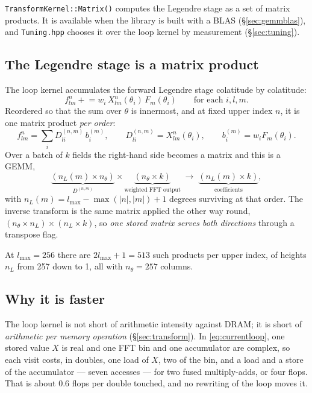 \documentclass[11pt,a4paper]{article}
\newcommand{\code}[1]{\texttt{#1}}
\begin{document}
\code{TransformKernel::Matrix()} computes the Legendre stage as a set of
matrix products.  It is available when the library is built with a BLAS
(\S\ref{sec:gemmblas}), and \code{Tuning.hpp} chooses it over the loop
kernel by measurement (\S\ref{sec:tuning}).

\subsection{The Legendre stage is a matrix product}

The loop kernel accumulates the forward Legendre stage colatitude by
colatitude:
\begin{equation}
  f^{n}_{lm} \mathrel{+}= w_i\, X^{n}_{lm}(\theta_i)\, F_m(\theta_i)
  \qquad\text{for each } i, l, m .
  \label{eq:currentloop}
\end{equation}
Reordered so that the sum over $\theta$ is innermost, and at fixed upper
index $n$, it is one matrix product \emph{per order}:
\begin{equation}
  f^{n}_{lm} = \sum_{i} D^{(n,m)}_{l i}\, b^{(m)}_{i},
  \qquad
  D^{(n,m)}_{l i} = X^{n}_{lm}(\theta_i),
  \qquad
  b^{(m)}_{i} = w_i F_m(\theta_i).
  \label{eq:gemv}
\end{equation}
Over a batch of $k$ fields the right-hand side becomes a matrix and this is
a GEMM,
\begin{equation}
  \underbrace{(n_L(m) \times n_\theta)}_{D^{(n,m)}}
  \times
  \underbrace{(n_\theta \times k)}_{\text{weighted FFT output}}
  \;\longrightarrow\;
  \underbrace{(n_L(m) \times k)}_{\text{coefficients}},
  \label{eq:gemmshape}
\end{equation}
with $n_L(m) = l_{\max} - \max(|n|,|m|) + 1$ degrees surviving at that
order.  The inverse transform is the same matrix applied the other way
round, $(n_\theta \times n_L) \times (n_L \times k)$, so \emph{one stored
matrix serves both directions} through a transpose flag.

At $l_{\max}=256$ there are $2l_{\max}+1 = 513$ such products per upper
index, of heights $n_L$ from 257 down to 1, all with $n_\theta = 257$
columns.

\subsection{Why it is faster}
\label{sec:gemmwhy}

The loop kernel is not short of arithmetic intensity against DRAM; it is
short of \emph{arithmetic per memory operation} (\S\ref{sec:transform}).
In \eqref{eq:currentloop}, one stored value $X$ is real and one FFT bin and
one accumulator are complex, so each visit costs, in doubles, one load of
$X$, two of the bin, and a load and a store of the accumulator --- seven
accesses --- for two fused multiply-adds, or four flops.  That is about
$0.6$ flops per double touched, and no rewriting of the loop moves it.
\end{document}
